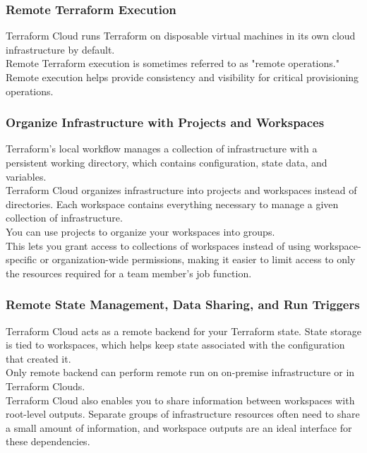 \documentclass[12pt, letterpaper, twoside]{article}
\begin{document}
\subsubsection{Remote Terraform Execution}
Terraform Cloud runs Terraform on disposable virtual machines in its own cloud infrastructure 
by default.\\
Remote Terraform execution is sometimes referred to as "remote operations."\\

Remote execution helps provide consistency and visibility for critical provisioning operations.

\subsubsection{Organize Infrastructure with Projects and Workspaces}
Terraform's local workflow manages a collection of infrastructure with a persistent working 
directory, which contains configuration, state data, and variables.\\
Terraform Cloud organizes infrastructure into projects and workspaces instead of directories. 
Each workspace contains everything necessary to manage a given collection of infrastructure.\\

You can use projects to organize your workspaces into groups.\\
This lets you grant access to collections of workspaces instead of using workspace-specific or 
organization-wide permissions, making it easier to limit access to only the resources required 
for a team member's job function.

\subsubsection{Remote State Management, Data Sharing, and Run Triggers}
Terraform Cloud acts as a remote backend for your Terraform state. State storage is tied to 
workspaces, which helps keep state associated with the configuration that created it.\\
Only remote backend can perform remote run on on-premise infrastructure or in Terraform Clouds.\\

Terraform Cloud also enables you to share information between workspaces with root-level outputs. 
Separate groups of infrastructure resources often need to share a small amount of information, 
and workspace outputs are an ideal interface for these dependencies.\\
\end{document}
